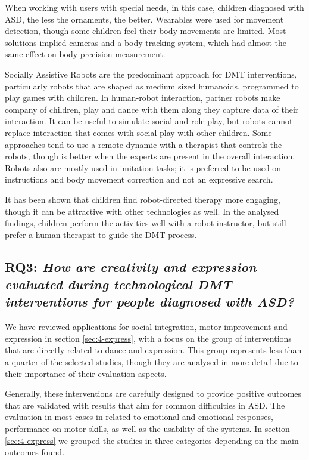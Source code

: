 \documentclass[a4paper,fleqn]{cas-sc}
\begin{document}
When working with users with special needs, in this case, children diagnosed with ASD, the less the ornaments, the better. Wearables were used for movement detection, though some children feel their body movements are limited. Most solutions implied cameras and a body tracking system, which had almost the same effect on body precision measurement.

Socially Assistive Robots are the predominant approach for DMT interventions, particularly robots that are shaped as medium sized humanoids, programmed to play games with children. In human-robot interaction, partner robots make company of children, play and dance with them along they capture data of their interaction. It can be useful to simulate social and role play, but robots cannot replace interaction that comes with social play with other children. Some approaches tend to use a remote dynamic with a therapist that controls the robots, though is better when the experts are present in the overall interaction. Robots also are mostly used in imitation tasks; it is preferred to be used on instructions and body movement correction and not an expressive search.

It has been shown that children find robot-directed therapy more engaging, though it can be attractive with other technologies as well. In the analysed findings, children perform the activities well with a robot instructor, but still prefer a human therapist to guide the DMT process.


\subsection{RQ3: \emph{How are creativity and expression evaluated during technological DMT interventions for people diagnosed with ASD?}} 
We have reviewed applications for social integration, motor improvement and expression in section \ref{sec:4-express},  with a focus on the group of interventions that are directly related to dance and expression. This group represents less than a quarter of the selected studies, though they are analysed in more detail due to their importance of their evaluation aspects.

 Generally, these interventions are carefully designed to provide positive outcomes that are validated with results that aim for common difficulties in ASD. The evaluation in most cases in related to emotional and emotional responses, performance on motor skills, as well as the usability of the systems. In section \ref{sec:4-express} we grouped the studies in three categories depending on the main outcomes found.
\end{document}
